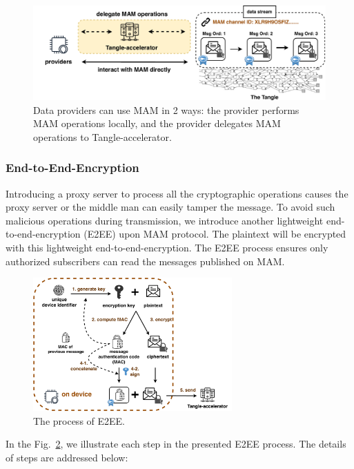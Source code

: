 \documentclass[conference]{IEEEtran}
\begin{document}
\begin{figure}[!t]
    \centering
    \includegraphics[width=\linewidth]{delegation}
    \caption{Data providers can use MAM in 2 ways: the provider performs MAM operations locally, and the provider delegates MAM operations to Tangle-accelerator.}
    \label{fig:delegation}
\end{figure}

\subsubsection{End-to-End-Encryption}
Introducing a proxy server to process all the cryptographic operations causes the proxy server or the middle man can easily tamper the message. To avoid such malicious operations during transmission, we introduce another lightweight end-to-end-encryption (E2EE) upon MAM protocol. The plaintext will be encrypted with this lightweight end-to-end-encryption. The E2EE process ensures only authorized subscribers can read the messages published on MAM.

\begin{figure}[!h]
    \centering
    \includegraphics[width=3in]{MAM_E2EE_fold}
    \caption{The process of E2EE.}
    \label{fig:MAM_E2EE}
\end{figure}

In the Fig.~\ref{fig:MAM_E2EE}, we illustrate each step in the presented E2EE process. The details of steps are addressed below:
\end{document}
